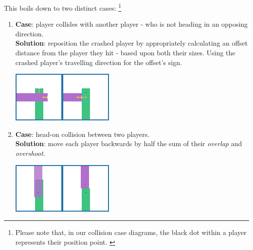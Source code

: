 \documentclass{standalone}
\begin{document}
			This boils down to two distinct cases: \footnote{Please note that, in our collision case diagrams, the black dot within a player represents their position point. \label{blackDotDiagram}}
			\begin{enumerate}
    		\item
    			\textbf{Case}: player collides with another player - who is not heading in an opposing direction.\\
					\textbf{Solution}: reposition the crashed player by appropriately calculating an offset distance from the player they hit - based upon both their sizes. Using the crashed player's travelling direction for the offset's sign. \\
					\begin{minipage}{\linewidth}
						\centering
						\captionsetup{width=.8\linewidth}
	          \includegraphics[width=.8\linewidth]{resources/images/collision/side.png}%
	    		\end{minipage}
				\item 
					\textbf{Case}: head-on collision between two players.\\
					\textbf{Solution}: move each player backwards by half the sum of their \emph{overlap} and \emph{overshoot}.\\
					\begin{minipage}{\linewidth}
						\centering
						\captionsetup{width=.8\linewidth}
	          \includegraphics[width=.8\linewidth]{resources/images/collision/headon.png}%
	    		\end{minipage}
			\end{enumerate}
\end{document}
